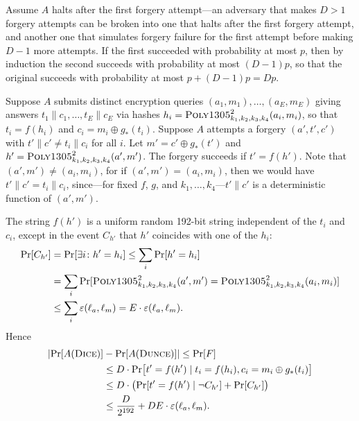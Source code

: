 \documentclass{article}
\def\operatorsc#1{{%
  \ifmmode\let\next=\operatorname\else\let\next=\relax\fi\next{\textsc{#1}}}}
\def\Poly#1/{\operatorsc{Poly#1}}
\def\DUNCE/{\operatorsc{Dunce}}
\def\DICE/{\operatorsc{Dice}}
\newcommand{\concat}{\mathbin\|}
\newcommand{\given}{\mathrel|}
\newcommand{\collisionbound}{\varepsilon}
\begin{document}
Assume $A$ halts after the first forgery attempt---an adversary that
 makes $D>1$ forgery attempts can be broken into one that halts after
 the first forgery attempt, and another one that simulates forgery
 failure for the first attempt before making $D-1$ more attempts.
If the first succeeded with probability at most $p$, then by induction
 the second succeeds with probability at most $(D - 1) p$, so that the
 original succeeds with probability at most $p + (D - 1) p = D p$.

Suppose $A$ submits distinct encryption queries
 $(a_1, m_1), \dotsc, (a_E, m_E)$
 giving answers
 $t_1 \concat c_1, \dotsc, t_E \concat c_E$
 via hashes
 $h_i = \Poly1305/^2_{k_1,k_2,k_3,k_4}(a_i, m_i)$,
 so that $t_i = f(h_i)$ and $c_i = m_i \oplus g_*(t_i)$.
Suppose $A$ attempts a forgery $(a', t', c')$ with
 $t' \concat c' \ne t_i \concat c_i$ for all $i$.
Let
 $m' = c' \oplus g_*(t')$
 and
 $h' = \Poly1305/^2_{k_1,k_2,k_3,k_4}(a', m')$.
The forgery succeeds if $t' = f(h')$.
Note that $(a', m') \ne (a_i, m_i)$, for if
 $(a', m') = (a_i, m_i)$,
 then we would have
 $t' \concat c' = t_i \concat c_i$, since---for fixed $f$, $g$, and
 $k_1,\dotsc,k_4$---$t' \concat c'$ is a deterministic function of
 $(a', m')$.

The string $f(h')$ is a uniform random 192-bit string independent of
 the $t_i$ and $c_i$, except in the event $C_{h'}$ that $h'$ coincides
 with one of the $h_i$:
%
\begin{align*}
  \Pr[C_{h'}]
  &= \Pr[\exists i\colon h' = h_i]
   \leq \sum_i \Pr[h' = h_i] \\
  &= \sum_i
       \Pr[\Poly1305/^2_{k_1,k_2,k_3,k_4}(a', m')
             = \Poly1305/^2_{k_1,k_2,k_3,k_4}(a_i, m_i)] \\
  &\leq \sum_i \collisionbound(\ell_a, \ell_m)
   = E \cdot \collisionbound(\ell_a, \ell_m).
\end{align*}
%
Hence
%
\begin{align*}
  \lvert\Pr[A(\DICE/)] &- \Pr[A(\DUNCE/)]\rvert
   \leq \Pr[F] \\
  &\leq D \cdot \Pr\bigl[t' = f(h')
            \given t_i = f(h_i), c_i = m_i \oplus g_*(t_i)\bigr] \\
  &\leq D \cdot \bigl(\Pr[t' = f(h') \given \lnot C_{h'}]
                      + \Pr[C_{h'}]\bigr) \\
  &\leq \frac{D}{2^{192}}
        + D E \cdot \collisionbound(\ell_a, \ell_m).
\end{align*}
\end{document}
